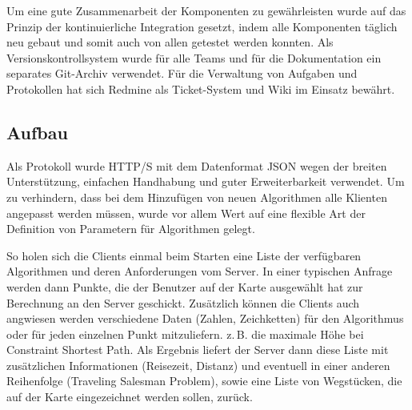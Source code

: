 Um eine gute Zusammenarbeit der Komponenten zu gewährleisten wurde auf das Prinzip der kontinuierliche Integration gesetzt, indem alle Komponenten täglich neu gebaut und somit auch von allen getestet werden konnten.
Als Versionskontrollsystem wurde für alle Teams und für die Dokumentation ein separates Git-Archiv verwendet. Für die Verwaltung von Aufgaben und Protokollen hat sich Redmine als Ticket-System und Wiki im Einsatz bewährt.

\subsection*{Aufbau}
Als Protokoll wurde \mbox{HTTP/S} mit dem Datenformat JSON wegen der breiten Unterstützung, einfachen Handhabung und guter Erweiterbarkeit verwendet. Um zu verhindern, dass bei dem Hinzufügen von neuen Algorithmen alle Klienten angepasst werden müssen, wurde vor allem Wert auf eine flexible Art der Definition von Parametern für Algorithmen gelegt.

So holen sich die Clients einmal beim Starten eine Liste der verfügbaren Algorithmen und deren Anforderungen vom Server. In einer typischen Anfrage werden dann Punkte, die der Benutzer auf der Karte ausgewählt hat zur Berechnung an den Server geschickt. Zusätzlich können die Clients auch angwiesen werden verschiedene Daten (Zahlen, Zeichketten) für den Algorithmus oder für jeden einzelnen Punkt mitzuliefern. z.\,B. die maximale Höhe bei Constraint Shortest Path. Als Ergebnis liefert der Server dann diese Liste mit zusätzlichen Informationen (Reisezeit, Distanz) und eventuell in einer anderen Reihenfolge (Traveling Salesman Problem), sowie eine Liste von Wegstücken, die auf der Karte eingezeichnet werden sollen, zurück.
